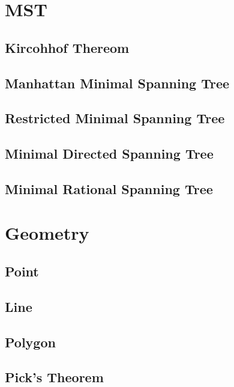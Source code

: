 \documentclass[10pt,twocolumn,oneside]{article}
\begin{document}
    \section{MST}
    \subsection{Kircohhof Thereom}
    
    \subsection{Manhattan Minimal Spanning Tree}
    
    \subsection{Restricted Minimal Spanning Tree}
    
    \subsection{Minimal Directed Spanning Tree}
    
    \subsection{Minimal Rational Spanning Tree}
    
    \section{Geometry}
    \subsection{Point}
    
    \subsection{Line}
    
    \subsection{Polygon}
    
    \subsection{Pick's Theorem}
    
\end{document}

